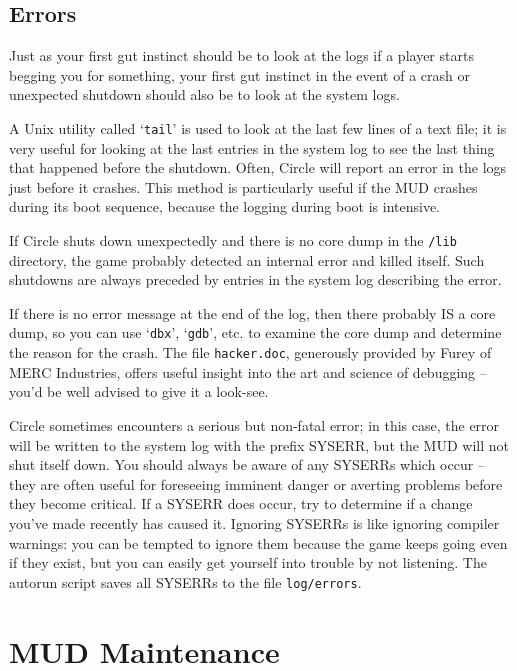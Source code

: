 \documentclass[11pt]{article}
\begin{document}
\subsection{Errors}
Just as your first gut instinct should be to look at the logs if a player starts begging you for something, your first gut instinct in the event of a crash or unexpected shutdown should also be to look at the system logs.
\par
A Unix utility called `\texttt{tail}' is used to look at the last few lines of a text file; it is very useful for looking at the last entries in the system log to see the last thing that happened before the shutdown.  Often, Circle will report an error in the logs just before it crashes.  This method is
particularly useful if the MUD crashes during its boot sequence, because the logging during boot is intensive.
\par
If Circle shuts down unexpectedly and there is no core dump in the \texttt{/lib} directory, the game probably detected an internal error and killed itself. Such shutdowns are always preceded by entries in the system log describing the error.
\par
If there is no error message at the end of the log, then there probably IS a core dump, so you can use `\texttt{dbx}', `\texttt{gdb}', etc. to examine the core dump and determine the reason for the crash.  The file \texttt{hacker.doc}, generously provided by Furey of MERC Industries, offers useful insight into the art and science of debugging -- you'd be well advised to give it a look-see.
\par
Circle sometimes encounters a serious but non-fatal error; in this case, the error will be written to the system log with the prefix SYSERR, but the MUD will not shut itself down.  You should always be aware of any SYSERRs which occur -- they are often useful for foreseeing imminent danger or averting problems before they become critical.  If a SYSERR does occur, try to determine if a change you've made recently has caused it.  Ignoring SYSERRs is like ignoring compiler warnings: you can be tempted to ignore them because the game keeps going even if they exist, but you can easily get yourself into trouble by not listening.  The autorun script saves all SYSERRs to the file \texttt{log/errors}.

\section{MUD Maintenance}
\end{document}
